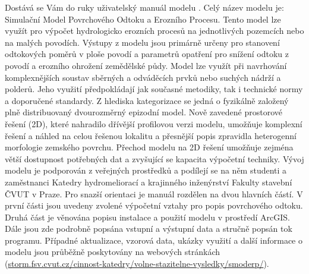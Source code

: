

Dostává se Vám do ruky uživatelský manuál modelu \smod. Celý název modelu je: Simulační Model Povrchového Odtoku a Erozního Procesu. Tento model lze využít pro výpočet hydrologicko erozních procesů na jednotlivých pozemcích nebo na malých povodích. Výstupy z modelu jsou primárně určeny pro stanovení odtokových poměrů v ploše povodí a parametrů opatření pro snížení odtoku z povodí a erozního ohrožení zemědělské půdy. Model lze využít při navrhování komplexnějších soustav sběrných a odváděcích prvků nebo suchých nádrží a polderů. Jeho využití předpokládají jak současné metodiky, tak i technické normy a doporučené standardy.
Z hlediska kategorizace se jedná o fyzikálně založený plně distribuovaný dvourozměrný epizodní model. 
% 
Nově zavedené prostorové řešení (2D), které nahradilo dřívější profilovou verzi modelu, umožňuje komplexní řešení a náhled na celou řešenou lokalitu a přesnější popis zpravidla heterogenní morfologie zemského povrchu. 
% 
Přechod modelu na 2D řešení umožňuje zejména větší dostupnost potřebných dat a zvyšující se kapacita výpočetní techniky. 
% 
% 
% 
Vývoj modelu je podporován z veřejných prostředků a podílejí se na něm studenti a zaměstnanci Katedry hydromeliorací a krajinného inženýrství Fakulty stavební ČVUT v Praze.
Pro snazší orientaci je manuál rozdělen na dvou hlavních částí. 
% 
V první části jsou uvedeny zvolené výpočetní vztahy pro popis povrchového odtoku. 
% 
Druhá část je věnována popisu instalace a použití modelu v prostředí ArcGIS. Dále jsou zde podrobně popsána vstupní a výstupní data a stručně popsán tok programu. 
Případné aktualizace, vzorová data, ukázky využití a další informace o modelu \smod jsou průběžně poskytovány na webových stránkách (\href{http://storm.fsv.cvut.cz/cinnost-katedry/volne-stazitelne-vysledky/smoderp/?lang=cz}{storm.fsv.cvut.cz/cinnost-katedry/volne-stazitelne-vysledky/smoderp/}).


